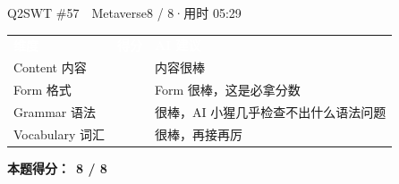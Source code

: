 \begin{qblock}{Q2\quad SWT \#57\ \ Metaverse}{8 / 8\quad·\quad 用时 05:29}
{\small\scorehead
\begin{tabularx}{\linewidth}{l c Y}
\textcolor{white}{\bfseries 维度} & \textcolor{white}{\bfseries 得分} & \textcolor{white}{\bfseries AI 建议}\\
Content 内容        &  & 内容很棒\\
Form 格式          &  & Form 很棒，这是必拿分数\\
Grammar 语法       &  & 很棒，AI 小猩几乎检查不出什么语法问题\\
Vocabulary 词汇    &  & 很棒，再接再厉\\
\end{tabularx}}
\smallskip
\textbf{本题得分：}\ {\color{cAccent}\bfseries 8 / 8}

\end{qblock}


